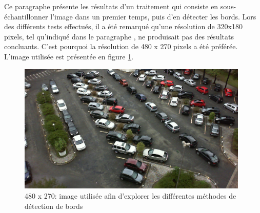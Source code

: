 \begin{appendix}
Ce paragraphe présente les résultats d'un traitement qui consiste en sous-échantillonner l'image dans un premier temps, puis d'en détecter les bords. Lors des différents tests effectués, il a été remarqué qu'une résolution de 320x180 pixels, tel qu'indiqué dans le paragraphe , ne produisait pas des résultats concluants. C'est pourquoi la résolution de 480 x 270 pixels a été préférée. L'image utilisée est présentée en figure \ref{fig:image_process_down_edge_orig}.

\begin{figure}[H]
    \includegraphics[width=110mm]{img/conception/image_process/downsample_only/2.png}
    \centering
    \caption{480 x 270: image utilisée afin d'explorer les différentes méthodes de détection de bords}
    \label{fig:image_process_down_edge_orig}
\end{figure}


\end{appendix}
